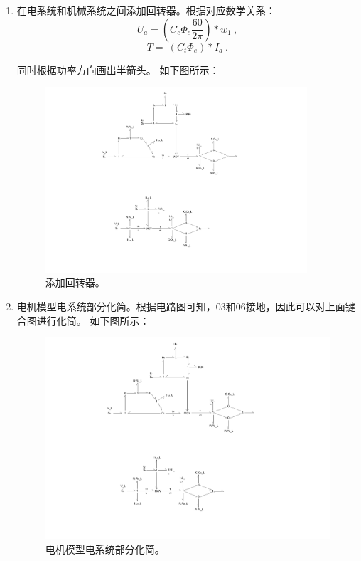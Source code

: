 \begin{enumerate}
	\item 在电系统和机械系统之间添加回转器。根据对应数学关系：
	\begin{equation}
	\label{equ:U_a}
	U_a
	=
	\left( C_e \Phi_e \frac{60}{2 \pi}\right) * w_1
	\ ,
	\end{equation}
	\begin{equation}
	\label{equ:U_a}
	T
	=\
	(C_t \Phi_e) * I_a
	\ .
	\end{equation}
	
	同时根据功率方向画出半箭头。
	如下图所示：	
	\begin{figure}[!h]
		\centering
		\includegraphics[width=0.92\textwidth]{fig/4_3_bond.pdf}
		\caption{添加回转器。}\label{fig:4_3_bond}
	\end{figure}
	
	\item 电机模型电系统部分化简。根据电路图可知，03和06接地，因此可以对上面键合图进行化简。
	如下图所示：
	\begin{figure}[!h]
		\centering
		\includegraphics[width=1.2\textwidth]{fig/4_4_bond.pdf}
		\caption{电机模型电系统部分化简。}\label{fig:4_4_bond}
	\end{figure}
	

\end{enumerate}
